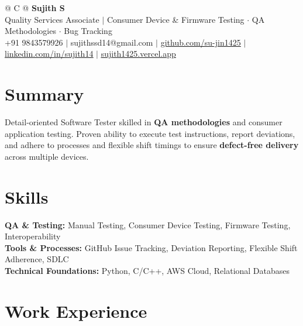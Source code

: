 \documentclass[a4paper,10pt]{article}
\newcommand{\ulink}[2]{\href{#1}{\uline{#2}}}
\begin{document}
\pagestyle{empty}

\begin{tabularx}{\linewidth}{@{} C @{}}
{\color[HTML]{000000}\fontsize{30}{35}\selectfont\bfseries Sujith S} \\[5pt]
{\fontsize{10.5}{12.5}\selectfont\color[HTML]{3A3A3A}
Quality Services Associate $|$ Consumer Device \& Firmware Testing $\cdot$ QA Methodologies $\cdot$ Bug Tracking} \\[6pt]
{\fontsize{9.5}{11.5}\selectfont\textcolor[HTML]{3A3A3A}{+91 9843579926 $|$ sujithssd14@gmail.com $|$ \ulink{https://github.com/su-jin1425}{github.com/su-jin1425} $|$ \ulink{https://linkedin.com/in/sujith14}{linkedin.com/in/sujith14} $|$ \ulink{https://sujith1425.vercel.app}{sujith1425.vercel.app}}}
\end{tabularx}

\vspace{2pt}

\section{Summary}
\vspace{1pt}
{\color[HTML]{0A0A0A}\fontsize{11}{14}\selectfont
Detail-oriented Software Tester skilled in \textbf{QA methodologies} and consumer application testing. Proven ability to execute test instructions, report deviations, and adhere to processes and flexible shift timings to ensure \textbf{defect-free delivery} across multiple devices.}

\vspace{1pt}

\section{Skills}
\vspace{1pt}
{\color[HTML]{0A0A0A}\fontsize{11}{14}\selectfont
\textbf{QA \& Testing:} Manual Testing, Consumer Device Testing, Firmware Testing, Interoperability \\[2pt]
\textbf{Tools \& Processes:} GitHub Issue Tracking, Deviation Reporting, Flexible Shift Adherence, SDLC \\[2pt]
\textbf{Technical Foundations:} Python, C/C++, AWS Cloud, Relational Databases}

\vspace{1pt}

\section{Work Experience}
\vspace{1pt}
\end{document}

